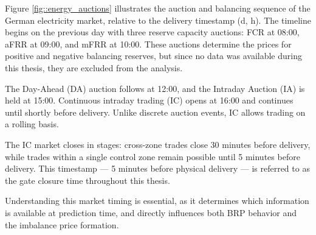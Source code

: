 \documentclass[class=scrbook, crop=false]{standalone}
\begin{document}
Figure \ref{fig::energy_auctions} illustrates the auction and balancing sequence of the German electricity market, relative to the delivery timestamp (d, h).
The timeline begins on the previous day with three reserve capacity auctions: FCR at 08:00, aFRR at 09:00, and mFRR at 10:00. These auctions determine the prices for positive and negative balancing reserves, but since no data was available during this thesis, they are excluded from the analysis.

The Day-Ahead (DA) auction follows at 12:00, and the Intraday Auction (IA) is held at 15:00. Continuous intraday trading (IC) opens at 16:00 and continues until shortly before delivery. Unlike discrete auction events, IC allows trading on a rolling basis.

The IC market closes in stages: cross-zone trades close 30 minutes before delivery, while trades within a single control zone remain possible until 5 minutes before delivery. This timestamp — 5 minutes before physical delivery — is referred to as the gate closure time throughout this thesis.

Understanding this market timing is essential, as it determines which information is available at prediction time, and directly influences both BRP behavior and the imbalance price formation.

 
 

\end{document}
